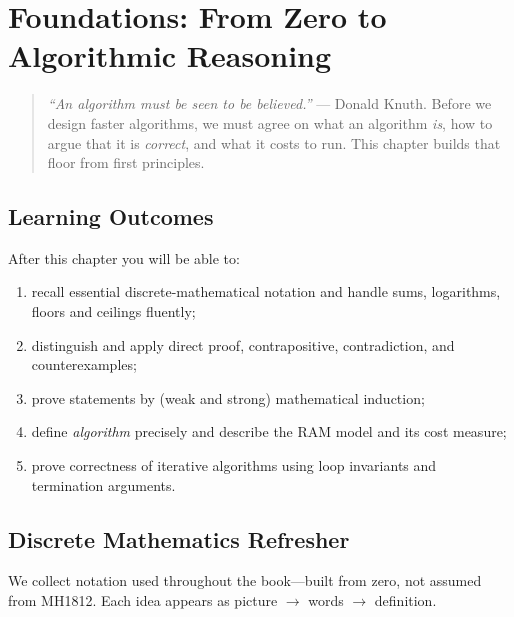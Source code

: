 \chapter{Foundations: From Zero to Algorithmic Reasoning}
\label{ch:foundations}

\begin{quote}
\emph{``An algorithm must be seen to be believed.''} --- Donald Knuth. Before we design faster algorithms, we must agree on what an algorithm \emph{is}, how to argue that it is \emph{correct}, and what it costs to run. This chapter builds that floor from first principles.
\end{quote}

\noindent{}
\vspace{0.4em}

\section*{Learning Outcomes}
After this chapter you will be able to:
\begin{enumerate}[label=(L\arabic*)]
    \item recall essential discrete-mathematical notation and handle sums, logarithms, floors and ceilings fluently;
    \item distinguish and apply direct proof, contrapositive, contradiction, and counterexamples;
    \item prove statements by (weak and strong) mathematical induction;
    \item define \emph{algorithm} precisely and describe the RAM model and its cost measure;
    \item prove correctness of iterative algorithms using loop invariants and termination arguments.
\end{enumerate}

\section{Discrete Mathematics Refresher}
\label{sec:discrete-refresher}
We collect notation used throughout the book---built from zero, not assumed from MH1812. Each idea appears as picture $\to$ words $\to$ definition.


